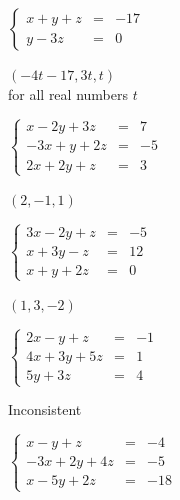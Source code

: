 \documentclass{ximera}
\begin{document}
\begin{question}
\begin{problem}
$\left\{ \begin{array}{rcr} x + y + z & = & -17  \\ y - 3z & = & 0  \end{array} \right.$

\begin{solution}
$(-4t - 17, 3t, t)$\\
for all real numbers $t$
\end{solution}
\end{problem}

\begin{problem}
$\left\{ \begin{array}{rcr} x-2y+3z & = & 7 \\ -3x+y+2z & = & -5 \\ 2x+2y+z & = & 3  \end{array} \right.$

\begin{solution}
$(2,-1,1)$
\end{solution}
\end{problem}

\begin{problem}
$\left\{ \begin{array}{rcr} 3x-2y+z & = & -5 \\ x+3y-z & = & 12 \\ x+y+2z & = & 0  \end{array} \right.$

\begin{solution}
$(1,3,-2)$
\end{solution}
\end{problem}

\begin{problem}
$\left\{ \begin{array}{rcr} 2x-y+z& = & -1 \\ 4x+3y+5z & = & 1 \\  5y+3z & = & 4 \end{array} \right.$

\begin{solution}
Inconsistent
\end{solution}
\end{problem}

\begin{problem}
$\left\{ \begin{array}{rcr} x-y+z & = & -4 \\ -3x+2y+4z & = & -5 \\ x-5y+2z & = & -18  \end{array} \right.$


\end{problem}
\end{question}
\end{document}
